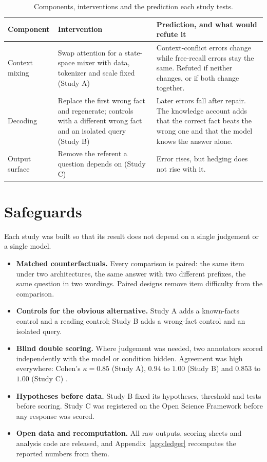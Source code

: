 \documentclass[11pt,a4paper,oneside]{report}
\begin{document}
\begin{table}[h]
\centering\small
\caption{Components, interventions and the prediction each study tests.}
\label{tab:design}
\begin{tabularx}{\linewidth}{@{}p{2.3cm}p{4.2cm}X@{}}
\toprule
Component & Intervention & Prediction, and what would refute it\\
\midrule
Context mixing & Swap attention for a state-space mixer with data, tokenizer and scale fixed (Study A) & Context-conflict errors change while free-recall errors stay the same. Refuted if neither changes, or if both change together.\\
Decoding & Replace the first wrong fact and regenerate; controls with a different wrong fact and an isolated query (Study B) & Later errors fall after repair. The knowledge account adds that the correct fact beats the wrong one and that the model knows the answer alone.\\
Output surface & Remove the referent a question depends on (Study C) & Error rises, but hedging does not rise with it.\\
\bottomrule
\end{tabularx}
\end{table}

\section{Safeguards}
Each study was built so that its result does not depend on a single judgement or a single model.
\begin{itemize}
\item \textbf{Matched counterfactuals.} Every comparison is paired: the same item under two architectures, the same answer with two different prefixes, the same question in two wordings. Paired designs remove item difficulty from the comparison.
\item \textbf{Controls for the obvious alternative.} Study A adds a known-facts control and a reading control; Study B adds a wrong-fact control and an isolated query.
\item \textbf{Blind double scoring.} Where judgement was needed, two annotators scored independently with the model or condition hidden. Agreement was high everywhere: Cohen's $\kappa=0.85$ (Study A), $0.94$ to $1.00$ (Study B) and $0.853$ to $1.00$ (Study C) \citep{cohen1960,landis1977}.
\item \textbf{Hypotheses before data.} Study B fixed its hypotheses, threshold and tests before scoring. Study C was registered on the Open Science Framework before any response was scored.
\item \textbf{Open data and recomputation.} All raw outputs, scoring sheets and analysis code are released, and Appendix~\ref{app:ledger} recomputes the reported numbers from them.
\end{itemize}
\end{document}
